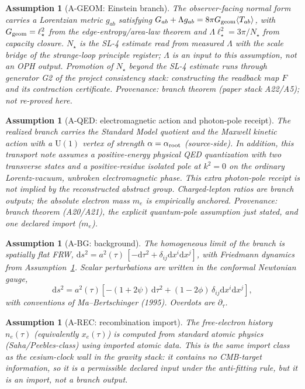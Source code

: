 \documentclass[11pt]{article}
\newtheorem{assumption}[theorem]{Assumption}
\theoremstyle{remark}
\newcommand{\Dd}{\mathrm{d}}
\begin{document}
\begin{assumption}[A-GEOM: Einstein branch]\label{a:geom}
The observer-facing normal form carries a Lorentzian metric $g_{ab}$
satisfying $G_{ab}+\Lambda g_{ab}=8\pi G_{\rm geom}\langle T_{ab}\rangle$,
with $G_{\rm geom}=\ell_\star^2$ from the edge-entropy/area-law theorem and
$\Lambda\ell_\star^2=3\pi/N_\star$ from capacity closure. $N_\star$ is the
SL-4 estimate read from measured $\Lambda$ with the scale bridge of the
strange-loop principle register; $\Lambda$ is an input to this assumption, not an
OPH output. Promotion of $N_\star$ beyond the SL-4 estimate runs through
generator G2 of the project consistency stack: constructing the readback
map $F$ and its contraction certificate. Provenance:
branch theorem (paper stack A22/A5); not re-proved here.
\end{assumption}

\begin{assumption}[A-QED: electromagnetic action and photon-pole receipt]\label{a:qed}
The realized branch carries the Standard Model quotient and the Maxwell
kinetic action with a $\mathrm U(1)$ vertex of strength
$\alpha=\alpha_{\rm root}$ (source-side). In addition, this transport note
assumes a positive-energy physical QED quantization with two transverse
states and a positive-residue isolated pole at $k^2=0$ on the ordinary
Lorentz-vacuum, unbroken electromagnetic phase. This extra photon-pole
receipt is not implied by the reconstructed abstract group. Charged-lepton
\emph{ratios} are branch outputs; the absolute electron mass $m_e$ is
empirically anchored. Provenance: branch theorem (A20/A21), the explicit
quantum-pole assumption just stated, and one declared import ($m_e$).
\end{assumption}

\begin{assumption}[A-BG: background]\label{a:bg}
The homogeneous limit of the branch is spatially flat FRW,
$\Dd s^2=a^2(\tau)\,[-\Dd\tau^2+\delta_{ij}\Dd x^i\Dd x^j]$, with Friedmann
dynamics from Assumption~\ref{a:geom}. Scalar perturbations are written in
the conformal Newtonian gauge,
\[
\Dd s^2=a^2(\tau)\left[-(1+2\psi)\,\Dd\tau^2+(1-2\phi)\,\delta_{ij}\Dd
x^i\Dd x^j\right],
\]
with conventions of Ma--Bertschinger (1995). Overdots are $\partial_\tau$.
\end{assumption}

\begin{assumption}[A-REC: recombination import]\label{a:rec}
The free-electron history $n_e(\tau)$ (equivalently $x_e(\tau)$) is computed
from standard atomic physics (Saha/Peebles-class) using imported atomic data.
This is the same import class as the cesium-clock wall in the gravity stack:
it contains no CMB-target information, so it is a permissible declared input
under the anti-fitting rule, but it is an import, not a branch output.
\end{assumption}
\end{document}
